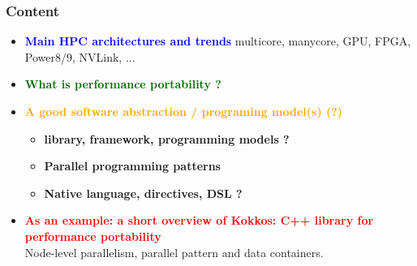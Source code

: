 \documentclass[9pt,hyperref={pdfpagemode=FullScreen,urlcolor=blue},xcolor=x11names]{beamer}
\begin{document}
\begin{frame}
  \frametitle{Content}
  
  {%
    \begin{itemize}
    \item \textcolor{blue}{\textbf{Main HPC architectures and trends}}
      multicore, manycore, GPU, FPGA, Power8/9, NVLink, ...
    \item \textcolor{darkgreen}{\textbf{What is performance portability ?}}\\
    \item \textcolor{orange}{\textbf{A good software abstraction / programing model(s) (?)}}
      
      \begin{itemize}
      \item \textbf{library, framework, programming models ?}
      \item \textbf{Parallel programming patterns}
      \item \textbf{Native language, directives, DSL ?}
      \end{itemize}
    \item \textcolor{red}{\textbf{As an example: a short overview of Kokkos: C++ library for performance portability}}\\
      Node-level parallelism, parallel pattern and data containers.
    \end{itemize}%
  }
\end{frame}
\end{document}
